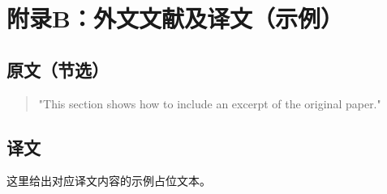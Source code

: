 \chapter{附录B：外文文献及译文（示例）}
\section*{原文（节选）}
\begin{quote}
"This section shows how to include an excerpt of the original paper."
\end{quote}

\section*{译文}
这里给出对应译文内容的示例占位文本。

